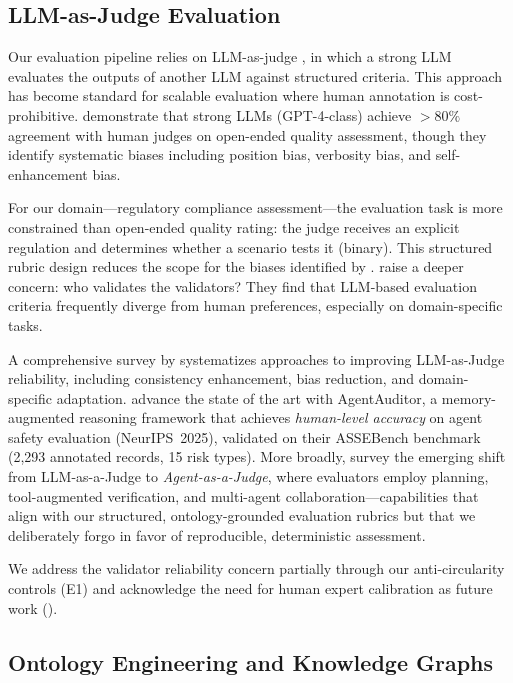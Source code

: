 \documentclass[11pt,a4paper]{article}
\begin{document}
\subsection{LLM-as-Judge Evaluation}

Our evaluation pipeline relies on LLM-as-judge
\citep{zheng2023judging}, in which a strong LLM evaluates the
outputs of another LLM against structured criteria. This approach
has become standard for scalable evaluation where human annotation
is cost-prohibitive. \citet{zheng2023judging} demonstrate that
strong LLMs (GPT-4-class) achieve $>80\%$ agreement with human
judges on open-ended quality assessment, though they identify
systematic biases including position bias, verbosity bias, and
self-enhancement bias.

For our domain---regulatory compliance assessment---the evaluation
task is more constrained than open-ended quality rating: the judge
receives an explicit regulation and determines whether a scenario
tests it (binary). This structured rubric design reduces the scope
for the biases identified by \citet{zheng2023judging}.
\citet{shankar2024validates} raise a deeper concern: who validates
the validators? They find that LLM-based evaluation criteria
frequently diverge from human preferences, especially on
domain-specific tasks.

A comprehensive survey by \citet{gu2024llmjudgesurvey} systematizes
approaches to improving LLM-as-Judge reliability, including consistency
enhancement, bias reduction, and domain-specific adaptation.
\citet{luo2025agentauditor} advance the state of the art with
AgentAuditor, a memory-augmented reasoning framework that achieves
\emph{human-level accuracy} on agent safety evaluation (NeurIPS~2025),
validated on their ASSEBench benchmark (2,293 annotated records,
15 risk types). More broadly, \citet{you2026agentjudge} survey the
emerging shift from LLM-as-a-Judge to \emph{Agent-as-a-Judge},
where evaluators employ planning, tool-augmented verification, and
multi-agent collaboration---capabilities that align with our
structured, ontology-grounded evaluation rubrics but that we
deliberately forgo in favor of reproducible, deterministic assessment.

We address the validator reliability concern partially through our
anti-circularity controls (E1) and acknowledge the need for human
expert calibration as future work ().

\subsection{Ontology Engineering and Knowledge Graphs}
\end{document}
